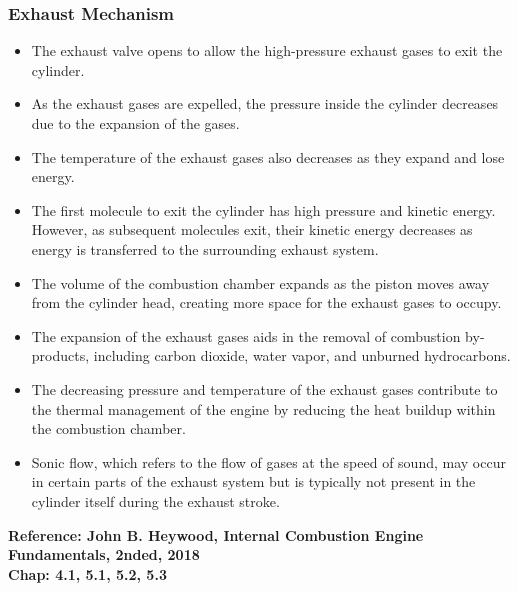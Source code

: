 \documentclass{article}
\begin{document}
  \subsubsection*{Exhaust Mechanism}
  \begin{itemize}
	\item The exhaust valve opens to allow the high-pressure exhaust gases to exit the cylinder.

	\item As the exhaust gases are expelled, the pressure inside the cylinder decreases due to the expansion of the gases.
	
	\item The temperature of the exhaust gases also decreases as they expand and lose energy.
	
	\item The first molecule to exit the cylinder has high pressure and kinetic energy. However, as subsequent molecules exit, their kinetic energy decreases as energy is transferred to the surrounding exhaust system.
	
	\item The volume of the combustion chamber expands as the piston moves away from the cylinder head, creating more space for the exhaust gases to occupy.
	
	\item The expansion of the exhaust gases aids in the removal of combustion by-products, including carbon dioxide, water vapor, and unburned hydrocarbons.
	
	\item The decreasing pressure and temperature of the exhaust gases contribute to the thermal management of the engine by reducing the heat buildup within the combustion chamber.
	
	\item Sonic flow, which refers to the flow of gases at the speed of sound, may occur in certain parts of the exhaust system but is typically not present in the cylinder itself during the exhaust stroke.
  \end{itemize}
  \vspace*{1cm}
  \textbf{Reference: John B. Heywood, Internal Combustion Engine Fundamentals, 2nded, 2018\\ Chap: 4.1, 5.1, 5.2, 5.3}
\end{document}
